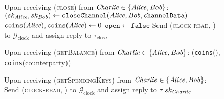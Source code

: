 \begin{figure}[H]
\begin{systembox}{\fch}
\begin{algorithmic}[1]
      \State Upon receiving (\textsc{close}) from $\mathit{Charlie} \in \{\mathit{Alice},
      \mathit{Bob}\}$:
      \Indent
        \State $(sk_{\mathit{Alice}}, sk_{\mathit{Bob}}) \gets \mathtt{closeChannel}(\mathit{Alice},
        \mathit{Bob}, \mathtt{channelData})$ 
        \State $\mathtt{coins}(\mathit{Alice}), \mathtt{coins}(\mathit{Alice}) \gets 0$
        \State $\mathtt{open} \gets \mathtt{false}$
        \State Send (\textsc{clock-read}, \fch) to
        $\mathcal{G}_{\mathrm{clock}}$ and assign reply to
        $\tau_{\mathrm{close}}$
      \EndIndent
      \Statex

      \State Upon receiving (\textsc{getBalance}) from $\mathit{Charlie} \in \{\mathit{Alice},
      \mathit{Bob}\}$:
      \Indent
        \State \Return (\texttt{coins}(\charlie), \texttt{coins}(counterparty))
      \EndIndent
      \Statex

      \State Upon receiving (\textsc{getSpendingKeys}) from $\mathit{Charlie} \in \{\mathit{Alice},
      \mathit{Bob}\}$:
      \Indent
        \State Send (\textsc{clock-read}, \fch) to
        $\mathcal{G}_{\mathrm{clock}}$ and assign reply to $\tau$
          \State \Return $sk_{\mathit{Charlie}}$
        \EndIf
      \EndIndent
    \end{algorithmic}
  \end{systembox}
  \caption{}
  \label{alg:chanfunc}
\end{figure}

